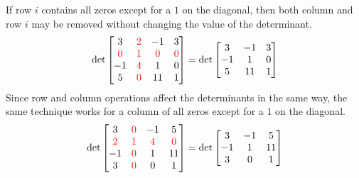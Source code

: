 \begin{applicationActivities}
\begin{fact}
If row \(i\) contains all zeros except for a \(1\) on the diagonal, 
then both column and row \(i\)
may be removed without changing the value of the determinant.
\[
  \det \begin{bmatrix}
    3 & \textcolor{red}{2} & -1 & 3 \\
    \textcolor{red}{0} & \textcolor{red}{1} 
      & \textcolor{red}{0} & \textcolor{red}{0} \\
    -1 & \textcolor{red}{4} & 1 & 0 \\
    5 & \textcolor{red}{0} & 11 & 1
  \end{bmatrix} =
  \det \begin{bmatrix}
    3 & -1 & 3 \\
    -1 & 1 & 0 \\
    5 & 11 & 1
  \end{bmatrix}
\]
Since row and column operations affect the determinants in the same
way, the same technique works for a column of all zeros except for
a \(1\) on the diagonal.
\[
  \det \begin{bmatrix}
    3 & \textcolor{red}{0} & -1 & 5 \\
    \textcolor{red}{2} & \textcolor{red}{1} & \textcolor{red}{4} & 
       \textcolor{red}{0} \\
    -1 & \textcolor{red}{0} & 1 & 11 \\
    3 & \textcolor{red}{0} & 0 & 1
  \end{bmatrix} =
  \det \begin{bmatrix}
    3 & -1 & 5 \\
    -1 & 1 & 11 \\
    3 & 0 & 1
  \end{bmatrix}
\] 
\end{fact}


\end{applicationActivities}

